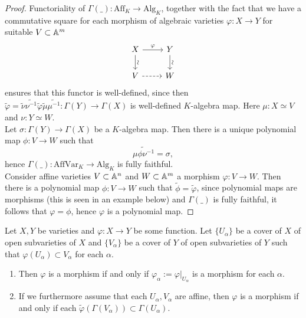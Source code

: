     \begin{proof}
        Functoriality of $\Gamma(\_): \mathrm{Aff}_K\rightarrow \mathrm{Alg}_K$, together with the fact that we have a commutative square for each morphism of algebraic varieties $\varphi: X\rightarrow Y$ for suitable $V\subset \mathbb{A}^m$
        $$
            \begin{tikzcd}
                X \arrow[r,"\varphi"]\arrow[d,"\sim"{rotate=90, anchor=north},swap] & Y\arrow[d,"\sim" {rotate=90, anchor=north},swap]\\
                V \arrow[r,dashrightarrow] & W
            \end{tikzcd}
        $$
        ensures that this functor is well-defined, since then $\widetilde{\varphi}=\widetilde{\nu}\widetilde{\nu^{-1}}\widetilde{\varphi} \widetilde{\mu}\widetilde{\mu^{-1}} : \Gamma(Y)\rightarrow \Gamma(X)$ is well-defined $K$-algebra map. Here $\mu: X\simeq V$ and $\nu : Y\simeq W$.\\
        Let $\sigma : \Gamma(Y)\rightarrow \Gamma(X)$ be a $K$-algebra map. Then there is a unique polynomial map $\phi: V\rightarrow W$ such that 
        $$\widetilde{\mu\phi\nu^{-1}}=\sigma,$$ 
        hence $\Gamma(\_): \mathrm{AffVar}_K\rightarrow \mathrm{Alg}_K$ is fully faithful.\\
        Consider affine varieties $V\subset \mathbb{A}^n$ and $W\subset \mathbb{A}^m$ a morphism $\varphi : V\rightarrow W$. Then there is a polynomial map $\phi : V\rightarrow W$ such that $\widetilde{\phi} = \widetilde{\varphi}$, since polynomial maps are morphisms (this is seen in an example below) and $\Gamma(\_)$ is fully faithful, it follows that $\varphi = \phi$, hence $\varphi$ is a polynomial map.   
    \end{proof}
    \begin{lemma}\label{LocalIsomorphismOnCoveringIsIsomorphism}
        Let $X,Y$ be varieties and $\varphi: X\rightarrow Y$ be some function. Let $\{U_\alpha\}$ be a cover of $X$ of open subvarieties of $X$ and $\{V_\alpha\}$ be a cover of $Y$ of open subvarieties of $Y$ such that $\varphi(U_\alpha)\subset V_\alpha$ for each $\alpha$.
        \begin{enumerate}
            \item Then $\varphi$ is a morphism if and only if $\varphi_\alpha := \left.\varphi\right|_{U_\alpha}$ is a morphism for each $\alpha$.
            \item If we furthermore assume that each $U_\alpha,V_\alpha$ are affine, then $\varphi$ is a morphism if and only if each $\widetilde{\varphi}(\Gamma(V_\alpha))\subset \Gamma(U_\alpha)$.
        \end{enumerate}        
    \end{lemma}
